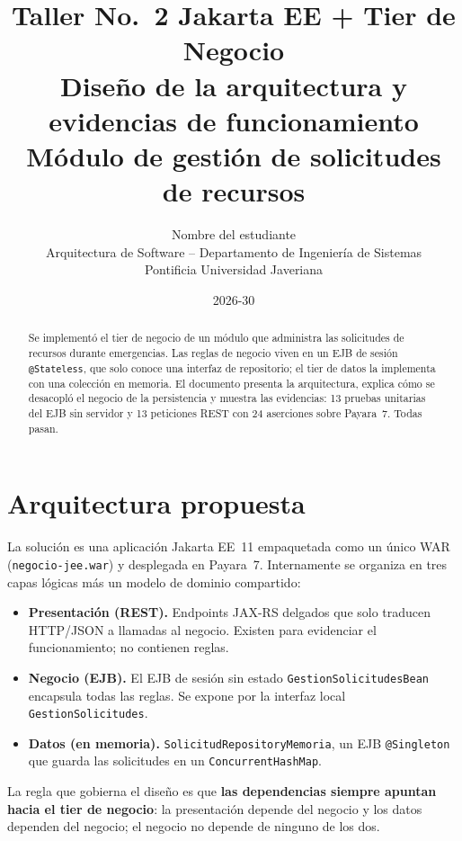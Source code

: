 \documentclass[11pt,letterpaper]{article}
\title{\textbf{Taller No.~2 Jakarta EE + Tier de Negocio}\\[4pt]
  \large Diseño de la arquitectura y evidencias de funcionamiento\\
  Módulo de gestión de solicitudes de recursos}
\author{Nombre del estudiante\\
  \small Arquitectura de Software -- Departamento de Ingeniería de Sistemas\\
  \small Pontificia Universidad Javeriana}
\date{2026-30}
\begin{document}
\sloppy
\maketitle

\begin{abstract}
\noindent Se implementó el tier de negocio de un módulo que administra las solicitudes de
recursos durante emergencias. Las reglas de negocio viven en un EJB de sesión
\texttt{@Stateless}, que solo conoce una interfaz de repositorio; el tier de datos la
implementa con una colección en memoria. El documento presenta la arquitectura, explica cómo
se desacopló el negocio de la persistencia y muestra las evidencias: 13 pruebas unitarias
del EJB sin servidor y 13 peticiones REST con 24 aserciones sobre Payara~7. Todas pasan.
\end{abstract}

\tableofcontents
\newpage

\section{Arquitectura propuesta}

La solución es una aplicación Jakarta EE~11 empaquetada como un único WAR
(\texttt{negocio-jee.war}) y desplegada en Payara~7. Internamente se organiza en tres capas
lógicas más un modelo de dominio compartido:

\begin{itemize}
  \item \textbf{Presentación (REST).} Endpoints JAX-RS delgados que solo traducen HTTP/JSON a
        llamadas al negocio. Existen para evidenciar el funcionamiento; no contienen reglas.
  \item \textbf{Negocio (EJB).} El EJB de sesión sin estado \texttt{GestionSolicitudesBean}
        encapsula todas las reglas. Se expone por la interfaz local \texttt{GestionSolicitudes}.
  \item \textbf{Datos (en memoria).} \texttt{SolicitudRepositoryMemoria}, un EJB
        \texttt{@Singleton} que guarda las solicitudes en un \texttt{ConcurrentHashMap}.
\end{itemize}

La regla que gobierna el diseño es que \textbf{las dependencias siempre apuntan hacia el
tier de negocio}: la presentación depende del negocio y los datos dependen del negocio; el
negocio no depende de ninguno de los dos.
\end{document}
